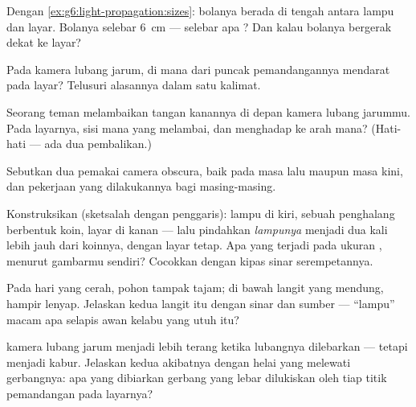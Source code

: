 \begin{exercise}[$\star$]\label{exo:g6:light-propagation:5}
Dengan \cref{ex:g6:light-propagation:sizes}: bolanya berada di tengah
antara lampu dan layar. Bolanya selebar \qty{6}{cm} --- selebar apa
? Dan kalau bolanya bergerak dekat ke layar?
\end{exercise}

\begin{exercise}[$\star$]\label{exo:g6:light-propagation:6}
Pada kamera lubang jarum, di mana  dari puncak pemandangannya
mendarat pada layar? Telusuri alasannya dalam satu kalimat.
\end{exercise}

\begin{exercise}[$\star$]\label{exo:g6:light-propagation:7}
Seorang teman melambaikan tangan kanannya di depan kamera lubang
jarummu. Pada layarnya, sisi mana yang melambai, dan menghadap ke arah
mana? (Hati-hati --- ada dua pembalikan.)
\end{exercise}

\begin{exercise}[$\star$]\label{exo:g6:light-propagation:8}
Sebutkan dua pemakai camera obscura, baik pada masa lalu maupun masa
kini, dan pekerjaan yang dilakukannya bagi masing-masing.
\end{exercise}

\begin{exercise}[$\star\star$]\label{exo:g6:light-propagation:9}
Konstruksikan (sketsalah dengan penggaris): lampu di kiri, sebuah
penghalang berbentuk koin, layar di kanan --- lalu pindahkan
\emph{lampunya} menjadi dua kali lebih jauh dari koinnya, dengan layar
tetap. Apa yang terjadi pada ukuran , menurut
gambarmu sendiri? Cocokkan dengan kipas sinar serempetannya.
\end{exercise}

\begin{exercise}[$\star\star$]\label{exo:g6:light-propagation:10}
Pada hari yang cerah,  pohon tampak tajam; di bawah
langit yang mendung,  hampir lenyap. Jelaskan kedua
langit itu dengan sinar dan sumber --- ``lampu'' macam apa selapis
awan kelabu yang utuh itu?
\end{exercise}

\begin{exercise}[$\star\star$]\label{exo:g6:light-propagation:11}
 kamera lubang jarum menjadi lebih terang ketika lubangnya
dilebarkan --- tetapi menjadi kabur. Jelaskan kedua akibatnya dengan
helai yang melewati gerbangnya: apa yang dibiarkan gerbang yang lebar
dilukiskan oleh tiap titik pemandangan pada layarnya?
\end{exercise}


